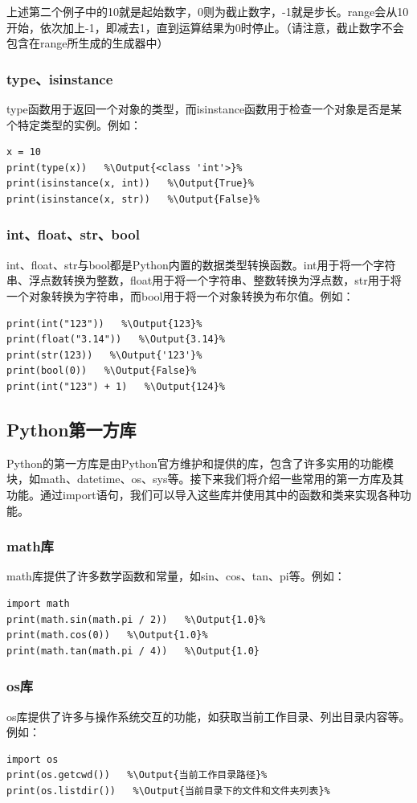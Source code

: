 \documentclass[../../Main.tex]{subfiles}
\begin{document}
上述第二个例子中的10就是起始数字，0则为截止数字，-1就是步长。range会从10开始，依次加上-1，即减去1，直到运算结果为0时停止。（请注意，截止数字不会包含在range所生成的生成器中）

\subsubsection{type、isinstance}
type函数用于返回一个对象的类型，而isinstance函数用于检查一个对象是否是某个特定类型的实例。例如：
\begin{lstlisting}
x = 10
print(type(x))   %\Output{<class 'int'>}%
print(isinstance(x, int))   %\Output{True}%
print(isinstance(x, str))   %\Output{False}%
\end{lstlisting}

\subsubsection{int、float、str、bool}
int、float、str与bool都是Python内置的数据类型转换函数。int用于将一个字符串、浮点数转换为整数，float用于将一个字符串、整数转换为浮点数，str用于将一个对象转换为字符串，而bool用于将一个对象转换为布尔值。例如：
\begin{lstlisting}
print(int("123"))   %\Output{123}%
print(float("3.14"))   %\Output{3.14}%
print(str(123))   %\Output{'123'}%
print(bool(0))   %\Output{False}%
print(int("123") + 1)   %\Output{124}%
\end{lstlisting}

\subsection{Python第一方库}
Python的第一方库是由Python官方维护和提供的库，包含了许多实用的功能模块，如math、datetime、os、sys等。接下来我们将介绍一些常用的第一方库及其功能。通过import语句，我们可以导入这些库并使用其中的函数和类来实现各种功能。
\subsubsection{math库}
math库提供了许多数学函数和常量，如sin、cos、tan、pi等。例如：
\begin{lstlisting}
import math
print(math.sin(math.pi / 2))   %\Output{1.0}%
print(math.cos(0))   %\Output{1.0}%
print(math.tan(math.pi / 4))   %\Output{1.0}
\end{lstlisting}

\subsubsection{os库}
os库提供了许多与操作系统交互的功能，如获取当前工作目录、列出目录内容等。例如：
\begin{lstlisting}
import os
print(os.getcwd())   %\Output{当前工作目录路径}%
print(os.listdir())   %\Output{当前目录下的文件和文件夹列表}%
\end{lstlisting}
\end{document}
